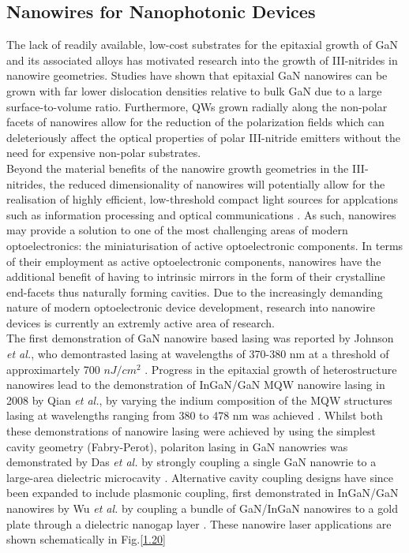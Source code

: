 \subsection{Nanowires for Nanophotonic Devices}
The lack of readily available, low-cost substrates for the epitaxial growth of GaN and its associated alloys has motivated research into the growth of III-nitrides in nanowire geometries. Studies have shown that epitaxial GaN nanowires can be grown with far lower dislocation densities relative to bulk GaN due to a large surface-to-volume ratio. Furthermore, QWs grown radially along the non-polar facets of nanowires allow for the reduction of the polarization fields which can deleteriously affect the optical properties of polar III-nitride emitters without the need for expensive non-polar substrates.\\
Beyond the material benefits of the nanowire growth geometries in the III-nitrides, the reduced dimensionality of nanowires will potentially allow for the realisation of highly efficient, low-threshold  compact light sources for applcations such as information processing and optical communications \cite{Arafin2013}. As such, nanowires may provide a solution to one of the most challenging areas of modern optoelectronics: the miniaturisation of active optoelectronic components. In terms of their employment as active optoelectronic components, nanowires have the additional benefit of having to intrinsic mirrors in the form of their crystalline end-facets thus naturally forming cavities. Due to the increasingly demanding nature of modern optoelectronic device development, research into nanowire devices is currently an extremly active area of research.\\
The first demonstration of GaN nanowire based lasing was reported by Johnson {\it et al.}, who demontrasted lasing at wavelengths of 370-380 nm at a threshold of approximartely 700 $nJ/cm^2$ \cite{Johnson2002}. Progress in the epitaxial growth of heterostructure nanowires lead to the demonstration of InGaN/GaN MQW nanowire lasing in 2008 by Qian {\it et al.}, by varying the indium composition of the MQW structures lasing at wavelengths ranging from 380 to 478 nm was achieved \cite{Qian2008}. Whilst both these demonstrations of nanowire lasing were achieved by using the simplest cavity geometry (Fabry-Perot), polariton lasing in GaN nanowries was demonstrated by Das {\it et al.} by strongly coupling a single GaN nanowrie to a large-area dielectric microcavity \cite{Das2011}. Alternative cavity coupling designs have since been expanded to include plasmonic coupling, first demonstrated in InGaN/GaN nanowires by Wu {\it et al.} by coupling a bundle of GaN/InGaN nanowires to a gold plate through a dielectric nanogap layer \cite{Wu2011}. These nanowire laser applications are shown schematically in Fig.\ref{1.20}

